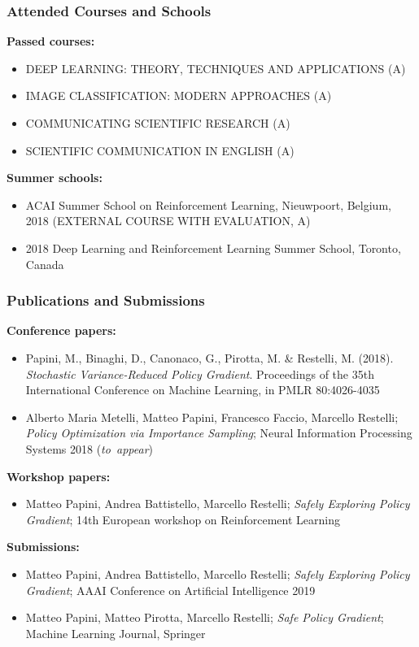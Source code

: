 \documentclass{beamer}
\begin{document}
\begin{frame}
\frametitle{Attended Courses and Schools}
\textbf{Passed courses:}
\begin{itemize}
	\item DEEP LEARNING: THEORY, TECHNIQUES AND APPLICATIONS (A)
	\item IMAGE CLASSIFICATION: MODERN APPROACHES (A)
	\item COMMUNICATING SCIENTIFIC RESEARCH (A) 
	\item SCIENTIFIC COMMUNICATION IN ENGLISH (A)
\end{itemize}

\vfill

\textbf{Summer schools:}
\begin{itemize}
	\item ACAI Summer School on Reinforcement Learning,  Nieuwpoort, Belgium, 2018 (EXTERNAL COURSE WITH EVALUATION, A)
	\item 2018 Deep Learning and Reinforcement Learning Summer School, Toronto, Canada
\end{itemize}

\end{frame}


\begin{frame}
\frametitle{Publications and Submissions}
\textbf{Conference papers:}
\begin{itemize}
	\scriptsize
	\item Papini, M., Binaghi, D., Canonaco, G., Pirotta, M. \& Restelli, M. (2018). \textit{Stochastic Variance-Reduced Policy Gradient}. Proceedings of the 35th International Conference on Machine Learning, in PMLR 80:4026-4035
	\item Alberto Maria Metelli, Matteo Papini, Francesco Faccio, Marcello Restelli; \textit{Policy Optimization via Importance Sampling}; Neural Information Processing Systems 2018 (\textit{to~appear})
\end{itemize}

\vfill

\textbf{Workshop papers:}
\begin{itemize}
	\scriptsize
	\item Matteo Papini, Andrea Battistello, Marcello Restelli; \textit{Safely Exploring Policy Gradient}; 14th European workshop on Reinforcement Learning
\end{itemize}

\vfill

\textbf{Submissions:}
\begin{itemize}
	\scriptsize
	\item Matteo Papini, Andrea Battistello, Marcello Restelli; \textit{Safely Exploring Policy Gradient}; AAAI Conference on Artificial Intelligence 2019
	\item Matteo Papini, Matteo Pirotta, Marcello Restelli; \textit{Safe Policy Gradient}; Machine Learning Journal, Springer
\end{itemize}

\end{frame}
\end{document}
